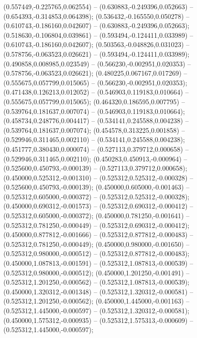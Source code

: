  (0.557449,-0.225765,0.062554) -- (0.630883,-0.249396,0.052663) -- (0.654393,-0.314853,0.064398);
 (0.536432,-0.165550,0.050278) -- (0.610743,-0.186160,0.042607) -- (0.630883,-0.249396,0.052663);
 (0.518630,-0.106804,0.039861) -- (0.593494,-0.124411,0.033989) -- (0.610743,-0.186160,0.042607);
 (0.503563,-0.048826,0.031023) -- (0.578756,-0.063523,0.026621) -- (0.593494,-0.124411,0.033989);
 (0.490858,0.008985,0.023549) -- (0.566230,-0.002951,0.020353) -- (0.578756,-0.063523,0.026621);
 (0.480225,0.067167,0.017269) -- (0.555675,0.057799,0.015065) -- (0.566230,-0.002951,0.020353);
 (0.471438,0.126213,0.012052) -- (0.546903,0.119183,0.010664) -- (0.555675,0.057799,0.015065);
 (0.464320,0.186595,0.007795) -- (0.539764,0.181637,0.007074) -- (0.546903,0.119183,0.010664);
 (0.458734,0.248776,0.004417) -- (0.534141,0.245588,0.004238) -- (0.539764,0.181637,0.007074);
 (0.454578,0.313225,0.001858) -- (0.529946,0.311465,0.002110) -- (0.534141,0.245588,0.004238);
 (0.451777,0.380430,0.000074) -- (0.527113,0.379712,0.000658) -- (0.529946,0.311465,0.002110);
 (0.450283,0.450913,-0.000964) -- (0.525600,0.450793,-0.000139) -- (0.527113,0.379712,0.000658);
 (0.450000,0.525312,-0.001310) -- (0.525312,0.525312,-0.000328) -- (0.525600,0.450793,-0.000139);
 (0.450000,0.605000,-0.001463) -- (0.525312,0.605000,-0.000372) -- (0.525312,0.525312,-0.000328);
 (0.450000,0.690312,-0.001573) -- (0.525312,0.690312,-0.000412) -- (0.525312,0.605000,-0.000372);
 (0.450000,0.781250,-0.001641) -- (0.525312,0.781250,-0.000449) -- (0.525312,0.690312,-0.000412);
 (0.450000,0.877812,-0.001666) -- (0.525312,0.877812,-0.000483) -- (0.525312,0.781250,-0.000449);
 (0.450000,0.980000,-0.001650) -- (0.525312,0.980000,-0.000512) -- (0.525312,0.877812,-0.000483);
 (0.450000,1.087813,-0.001591) -- (0.525312,1.087813,-0.000539) -- (0.525312,0.980000,-0.000512);
 (0.450000,1.201250,-0.001491) -- (0.525312,1.201250,-0.000562) -- (0.525312,1.087813,-0.000539);
 (0.450000,1.320312,-0.001348) -- (0.525312,1.320312,-0.000581) -- (0.525312,1.201250,-0.000562);
 (0.450000,1.445000,-0.001163) -- (0.525312,1.445000,-0.000597) -- (0.525312,1.320312,-0.000581);
 (0.450000,1.575312,-0.000935) -- (0.525312,1.575313,-0.000609) -- (0.525312,1.445000,-0.000597);
